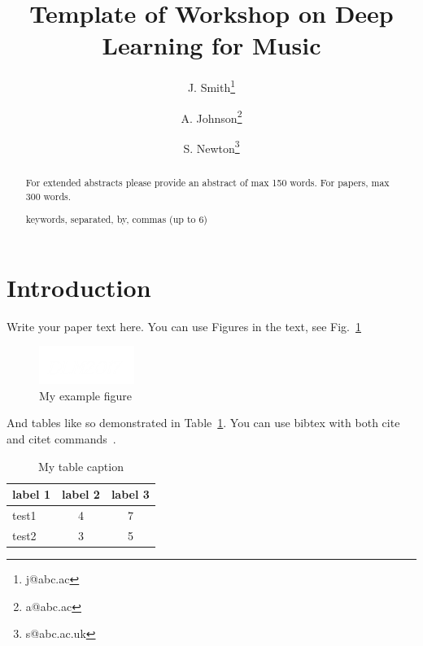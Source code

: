 \documentclass[DIV12]{scrartcl}
\date{}
\title{Template of Workshop on Deep Learning for Music}
\begin{document}
\author[1]{J. Smith\thanks{j@abc.ac}}
\author[1]{A. Johnson\thanks{a@abc.ac}}
\author[2]{S. Newton\thanks{s@abc.ac.uk}}




\maketitle

\begin{abstract}
For extended abstracts please provide an abstract of max 150 words. For papers, max 300 words. 

\bigskip

 keywords, separated, by, commas (up to 6)

\end{abstract}


\section{Introduction}

Write your paper text here. You can use Figures in the text, see Fig.~\ref{fig:example}

\begin{figure}[h]
\centering
\includegraphics[width=.2\textwidth]{logo.png}
\caption{My example figure}
\label{fig:example}
\end{figure}

And tables like so demonstrated in Table~\ref{tab:example}. You can use bibtex with both cite
~\citep{bengio2013advances} and citet commands~\citet{hamel2010learning}. 


\blindtext[1]

\begin{table}[h]
\centering
\caption{My table caption}
\label{tab:example}
\begin{tabular}{lcc}
\toprule
label 1 & label 2 & label 3 \\
\midrule
test1 & 4 & 7 \\
test2 & 3 & 5 \\
\bottomrule
\end{tabular}
\end{table}

\blindtext[1]


\end{document}

